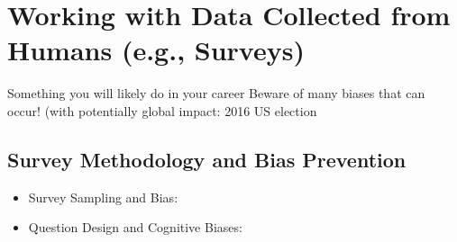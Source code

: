 \documentclass[11pt]{article}
\theoremstyle{definition}
\begin{document}
\section{Working with Data Collected from
Humans (e.g., Surveys)}
Something you will likely do in your career
Beware of many biases that can occur!
(with potentially global impact: 2016 US election

\subsection{Survey Methodology and Bias Prevention}
\begin{itemize}
    \item Survey Sampling and Bias:
    \item Question Design and Cognitive Biases:
\end{itemize}
\end{document}
